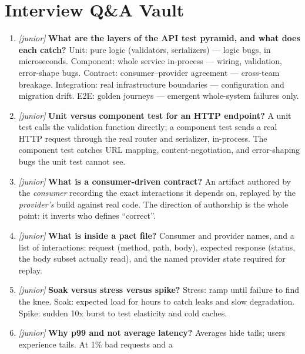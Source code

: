 \section{Interview Q\&A Vault}
\label{sec:ch19-interviews}

\begin{enumerate}[label=\textbf{Q\arabic*.}, leftmargin=1.7cm]
  \item \emph{[junior]} \textbf{What are the layers of the API test
        pyramid, and what does each catch?} Unit: pure logic (validators,
        serializers) --- logic bugs, in microseconds. Component: whole
        service in-process --- wiring, validation, error-shape bugs.
        Contract: consumer--provider agreement --- cross-team breakage.
        Integration: real infrastructure boundaries --- configuration and
        migration drift. E2E: golden journeys --- emergent whole-system
        failures only.
  \item \emph{[junior]} \textbf{Unit versus component test for an HTTP
        endpoint?} A unit test calls the validation function directly; a
        component test sends a real HTTP request through the real router
        and serializer, in-process. The component test catches URL
        mapping, content-negotiation, and error-shaping bugs the unit
        test cannot see.
  \item \emph{[junior]} \textbf{What is a consumer-driven contract?} An
        artifact authored by the \emph{consumer} recording the exact
        interactions it depends on, replayed by the \emph{provider's}
        build against real code. The direction of authorship is the whole
        point: it inverts who defines ``correct''.
  \item \emph{[junior]} \textbf{What is inside a pact file?} Consumer and
        provider names, and a list of interactions: request (method, path,
        body), expected response (status, the body subset actually read),
        and the named provider state required for replay.
  \item \emph{[junior]} \textbf{Soak versus stress versus spike?} Stress:
        ramp until failure to find the knee. Soak: expected load for
        hours to catch leaks and slow degradation. Spike: sudden 10x
        burst to test elasticity and cold caches.
  \item \emph{[junior]} \textbf{Why p99 and not average latency?} Averages
        hide tails; users experience tails. At 1\% bad requests and a

\end{enumerate}
